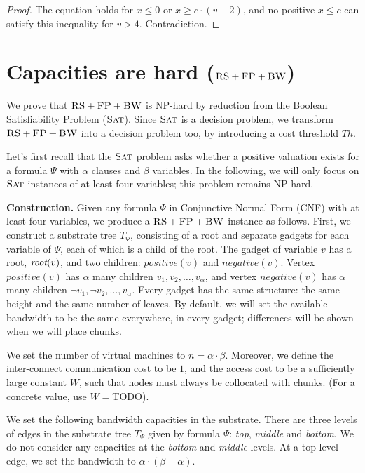 \documentclass[9pt,twocolumn]{scrartcl}
\newcommand{\aroot}{\emph{root}}
\newcommand{\clauses}{\alpha}
\newcommand{\variables}{\beta}
\newcommand{\FP}{\textsc{FP}}
\newcommand{\RS}{\textsc{RS}}
\newcommand{\BW}{\textsc{BW}}
\newcommand{\Tree}{\ensuremath{T}}
\newcommand{\SAT}{\textsc{Sat}}
\newcommand{\Formula}{\ensuremath{\Psi}}
\newcommand{\Thr}{\ensuremath{Th}}
\newcommand{\positive}{\ensuremath{positive}}
\newcommand{\negative}{\ensuremath{negative}}
\begin{document}
\begin{appendix}
\begin{proof}
The equation holds for $x \leq 0$ or $x \geq c \cdot (v - 2)$, 
and no 
positive $x \leq c$ can satisfy this inequality for $v > 4$. Contradiction.
\end{proof}


\section{Capacities are hard ($\RS+\FP+\BW$)}

We prove that $\RS+\FP+\BW$ is NP-hard by reduction from the Boolean Satisfiability Problem ($\SAT$).
Since $\SAT$ is a decision
problem, we transform $\RS+\FP+\BW$ into a decision problem too, by
introducing a cost threshold $\Thr$.

Let's first recall that the $\SAT$ problem asks whether a positive valuation exists
for a formula $\Formula$ with $\clauses$ clauses and $\variables$ variables.
In the following, we will only focus on $\SAT$ instances of at least four variables;
this problem remains NP-hard.

\textbf{Construction.}
Given any formula $\Formula$ in Conjunctive Normal Form (CNF) with at least four variables, we produce
a $\RS+\FP+\BW$ instance as follows. First, we construct a substrate tree $\Tree_{\Formula}$, consisting of
a root and separate gadgets for each variable of $\Formula$, each of which
is a child of the root.
The gadget of variable $v$ has a root, $\aroot(v)$, and two children:
$\positive(v)$ and $\negative(v)$. Vertex $\positive(v)$ has $\clauses$
many children $v_1, v_2, \ldots, v_{\clauses}$, and vertex $\negative(v)$ has
$\clauses$ many children $\neg v_1, \neg v_2, \dots, v_{\clauses}$. Every
gadget has the same structure: the same height and the same number of
leaves. By default, we will set the available bandwidth to be the
same everywhere, in every gadget; differences will be shown when we
will place chunks.

We set the number of virtual machines to $n = \clauses \cdot \variables$.
Moreover, we define the inter-connect communication cost to be $1$,
and the access cost to be a sufficiently large constant $W$,
such that nodes must always be collocated with chunks.
(For a concrete value, use $W=$TODO).


We set the following bandwidth capacities in the substrate. There are three
levels of edges in the substrate tree $\Tree_{\Formula}$ given by formula
$\Formula$: \emph{top}, \emph{middle} and \emph{bottom}.
We do not consider any capacities at the \emph{bottom} and \emph{middle} levels.
At a top-level edge, we set the bandwidth to $\clauses \cdot (\variables -
\clauses)$.


\end{appendix}
\end{document}
